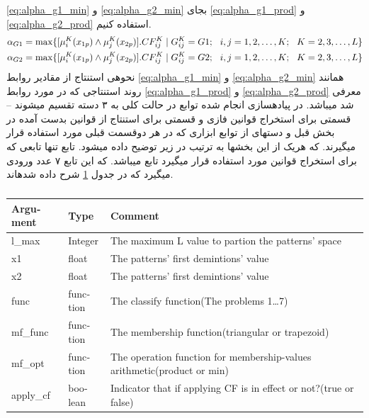 \documentclass[10pt,a4paper]{article}
\newcommand{\نیمفاصله}{\halfspace}
\renewcommand{\ }{\halfspace}
\renewcommand{\m}[1]{\lr{\mcode{#1}}}
\begin{document}
\ref{eq:alpha_g1_min} و \ref{eq:alpha_g2_min}
بجای
\ref{eq:alpha_g1_prod} و \ref{eq:alpha_g2_prod}
استفاده کنیم.
\begin{eqnarray}\tiny
    \alpha_{G1} = \max\{[\mu_i^K(x_{1p}) \wedge \mu_j^K(x_{2p})] . CF_{ij}^K \mid G_{ij}^K = G1; \hspace{1em} i, j = 1, 2, \ldots , K;\hspace{1em}K = 2, 3, \ldots , L\}   \label{eq:alpha_g1_min}\\\tiny
    \alpha_{G2} = \max\{[\mu_i^K(x_{1p}) \wedge \mu_j^K(x_{2p})] . CF_{ij}^K \mid G_{ij}^K = G2; \hspace{1em} i, j = 1, 2, \ldots , K;\hspace{1em}K = 2, 3, \ldots , L\}   \label{eq:alpha_g2_min}
\end{eqnarray}
نحوه\ ی استنتاج از مقادیر روابط
\ref{eq:alpha_g1_min} و \ref{eq:alpha_g2_min}
همانند روند استنتاجی که در مورد روابط
\ref{eq:alpha_g1_prod} و \ref{eq:alpha_g2_prod}
معرفی شد می\ باشد.
\newpage
\قسمت{پیاده\ سازی مقاله}
در پیاده\ سازی انجام شده توابع در حالت کلی به ۳ دسته تقسیم می\ شوند -- قسمتی برای استخراج قوانین فازی و قسمتی برای استنتاج از قوانین بدست آمده در بخش قبل و دسته\ ای از توابع ابزاری که در هر دوقسمت قبلی مورد استفاده قرار می\ گیرند. که هریک از این بخش\ ها به ترتیب در زیر توضیح داده می\ شود.
تابع  تنها تابعی که برای استخراج قوانین مورد استفاده قرار می\ گیرد تابع
\m{gen_rules(.)}
می\ باشد. که این تابع ۷ عدد ورودی می\ گیرد که در جدول
\ref{tab:gen_rules}
شرح داده شده\ اند.
\begin{latin}
    \begin{table}[h]
        \centering
        \begin{tabular}{ | l | l | l | }
            \hline        
            Argument   & Type         & Comment\\\hline
            l\_max     & Integer      & The maximum L value to partion the patterns' space\\\hline
            x1         & float        & The patterns' first demintions' value\\\hline
            x2         & float        & The patterns' first demintions' value\\\hline
            func       & function     & The classify function(The problems 1{\ldots}7)\\\hline
            mf\_func   & function     & The membership function(triangular or trapezoid)\\\hline
            mf\_opt    & function     & The operation function for membership-values arithmetic(product or min)\\\hline
            apply\_cf  & boolean      & Indicator that if applying CF is in effect or not?(true or false)\\\hline
        \end{tabular}
        \caption{}
        \label{tab:gen_rules}
    \end{table}
\end{latin}
\end{document}
